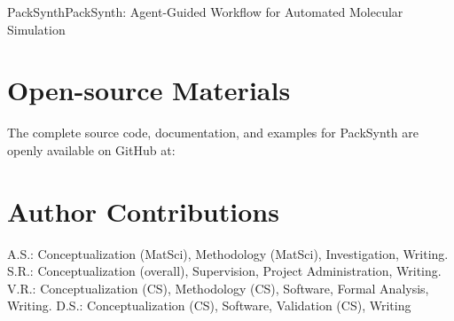 \begin{teamsubmission}{PackSynth}{PackSynth: Agent-Guided Workflow for Automated Molecular Simulation}
\section*{Open-source Materials}
The complete source code, documentation, and examples for PackSynth are openly available on GitHub at: 

\section*{Author Contributions}
A.S.: Conceptualization (MatSci), Methodology (MatSci), Investigation, Writing. S.R.: Conceptualization (overall), Supervision, Project Administration, Writing. V.R.: Conceptualization (CS), Methodology (CS), Software, Formal Analysis, Writing. D.S.: Conceptualization (CS), Software, Validation (CS), Writing

\end{teamsubmission}




